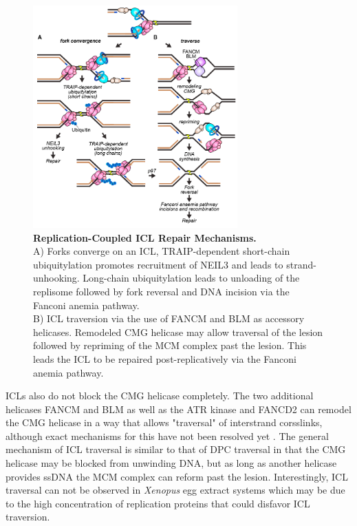 \begin{figure}[H]
    \centering
    \includegraphics[width=0.7\textwidth]{resources/images/Intro/icl_replication.PNG}
    \caption[Replication-Coupled ICL Repair Mechanisms]{\textbf{Replication-Coupled ICL Repair Mechanisms.}\\
    A) Forks converge on an ICL, TRAIP-dependent short-chain ubiquitylation promotes recruitment of NEIL3 and leads to strand-unhooking. Long-chain ubiquitylation leads to unloading of the replisome followed by fork reversal and DNA incision via the Fanconi anemia pathway.\\
    B) ICL traversion via the use of FANCM and BLM as accessory helicases. Remodeled CMG helicase may allow traversal of the lesion followed by repriming of the MCM complex past the lesion. This leads the ICL to be repaired post-replicatively via the Fanconi anemia pathway.\\
    \citep{Cortez.2019}}
    \label{fig:iclrepl}
\end{figure}
ICLs also do not block the CMG helicase completely. The two additional helicases FANCM and BLM as well as the ATR kinase and FANCD2 can remodel the CMG helicase \citep{Huang.2013} in a way that allows "traversal" of interstrand corsslinks, although exact mechanisms for this have not been resolved yet \citep{Huang.2019}. The general mechanism of ICL traversal is similar to that of DPC traversal in that the CMG helicase may be blocked from unwinding DNA, but as long as another helicase provides ssDNA the MCM complex can reform past the lesion. Interestingly, ICL traversal can not be observed in \textit{Xenopus} egg extract systems which may be due to the high concentration of replication proteins that could disfavor ICL traversion.\\
